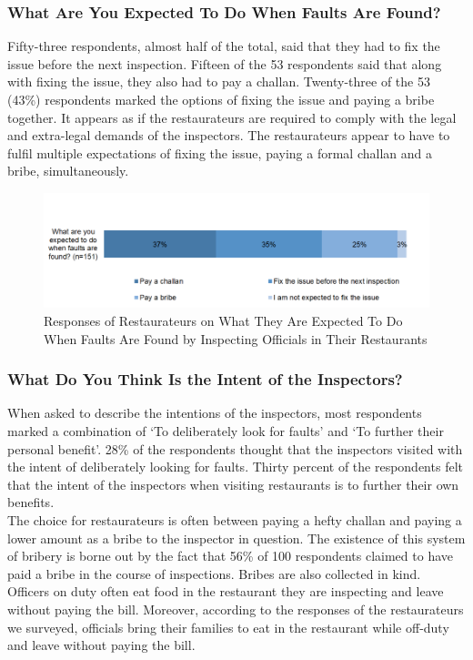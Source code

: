 \documentclass[a4paper, 12pt]{article}
\begin{document}
		\subsubsection {What Are You Expected To Do When Faults Are Found?}
		Fifty-three respondents, almost half of the total, said that they had to fix the issue before the next inspection. Fifteen of the 53 respondents said that along with fixing the issue, they also had to pay a challan. Twenty-three of the 53 (43\%) respondents 
marked the options of fixing the issue and paying a bribe together. It appears as if the restaurateurs are required to comply with the legal and extra-legal demands of the inspectors. The restaurateurs appear to have to fulfil multiple expectations of fixing the issue, 
paying a formal challan and a bribe, simultaneously.

		\begin{figure}[H]
                    	\centering
                    	\includegraphics[width = 6.5in]{Figure6.png}
                    	\caption[Optional Caption]{Responses of Restaurateurs on What They Are Expected To Do When Faults Are Found by Inspecting Officials in Their Restaurants}
		\end{figure}

		
		\subsubsection {What Do You Think Is the Intent of the Inspectors?}
			When asked to describe the intentions of the inspectors, most respondents marked a combination of ‘To deliberately look for faults’ and ‘To further their personal benefit’. 28\% of the respondents thought that the inspectors visited with the intent of 
deliberately looking for faults. Thirty percent of the respondents felt that the intent of the inspectors when visiting restaurants is to further their own benefits.\\
		
		The choice for restaurateurs is often between paying a hefty challan and paying a lower amount as a bribe to the inspector in question. The existence of this system of bribery is borne out by the fact that 56\% of 100 respondents claimed to have paid a 
bribe in the course of inspections. Bribes are also collected in kind. Officers on duty often eat food in the restaurant they are inspecting and leave without paying the bill. Moreover, according to the responses of the restaurateurs we surveyed, officials bring their 
families to eat in the restaurant while off-duty and leave without paying the bill.\\
		
\end{document}
